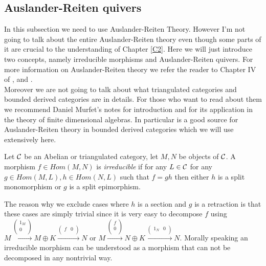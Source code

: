 \subsection{Auslander-Reiten quivers}
\indent In this subsection we need to use Auslander-Reiten Theory. However I'm not going to talk about the entire Auslander-Reiten theory even though some parts of it are crucial to the understanding of Chapter \ref{C2}. Here we will just introduce two concepts, namely irreducible morphisms and Auslander-Reiten quivers. For more information on Auslander-Reiten theory we refer the reader to Chapter IV of \cite{ASS06}, \cite{ARS} and \cite{H88}.\\
\indent Moreover we are not going to talk about what triangulated categories and bounded derived categories are in details. For those who want to read about them we recommend Daniel Murfet's notes \cite{MurD1}\cite{MurD2}\cite{MurT1} for introduction and \cite{H88} for its application in the theory of finite dimensional algebras. In particular \cite{H88} is a good source for Auslander-Reiten theory in bounded derived categories which we will use extensively here.\\
\begin{definition}
Let $\mathcal{C}$ be an Abelian or triangulated category, let $M,N$ be objects of $\mathcal{C}$. A morphism $f\in Hom(M,N)$ is \textit{irreducible} if for any $L\in\mathcal{C}$ for any $g\in Hom(M, L), h\in Hom(N, L)$ such that $f = gh$ then either $h$ is a split monomorphism or $g$ is a split epimorphism. 
\end{definition}
\indent The reason why we exclude cases where $h$ is a section and $g$ is a retraction is that these cases are simply trivial since it is very easy to decompose $f$ using $M\overset{\begin{pmatrix}1_M\\0\\\end{pmatrix}}{\longrightarrow}M\oplus K\overset{\begin{pmatrix}f &0\\\end{pmatrix}}{\longrightarrow} N$ or $M\overset{\begin{pmatrix}f\\0\\\end{pmatrix}}{\longrightarrow}N\oplus K\overset{\begin{pmatrix}1_N &0\\\end{pmatrix}}{\longrightarrow} N$. Morally speaking an irreducible morphism can be understood as a morphism that can not be decomposed in any nontrivial way.\\
